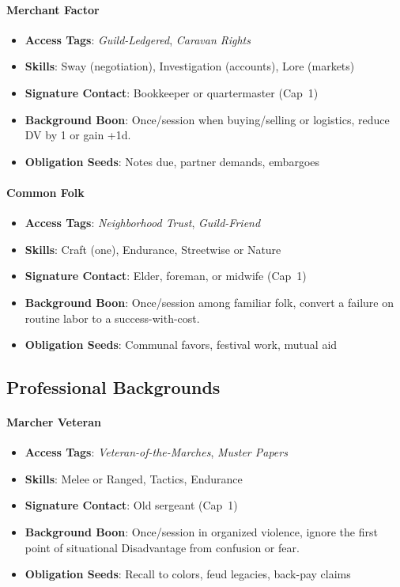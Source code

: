 \begin{multicols}{2}
\paragraph{Merchant Factor}
\begin{itemize}
\item \textbf{Access Tags}: \textit{Guild-Ledgered}, \textit{Caravan Rights}
\item \textbf{Skills}: Sway (negotiation), Investigation (accounts), Lore (markets)
\item \textbf{Signature Contact}: Bookkeeper or quartermaster (Cap~1)
\item \textbf{Background Boon}: Once/session when buying/selling or logistics, reduce DV by 1 or gain +1d.
\item \textbf{Obligation Seeds}: Notes due, partner demands, embargoes
\end{itemize}

\paragraph{Common Folk}
\begin{itemize}
\item \textbf{Access Tags}: \textit{Neighborhood Trust}, \textit{Guild-Friend}
\item \textbf{Skills}: Craft (one), Endurance, Streetwise or Nature
\item \textbf{Signature Contact}: Elder, foreman, or midwife (Cap~1)
\item \textbf{Background Boon}: Once/session among familiar folk, convert a failure on routine labor to a success-with-cost.
\item \textbf{Obligation Seeds}: Communal favors, festival work, mutual aid
\end{itemize}

\subsection*{Professional Backgrounds}

\paragraph{Marcher Veteran}
\begin{itemize}
\item \textbf{Access Tags}: \textit{Veteran-of-the-Marches}, \textit{Muster Papers}
\item \textbf{Skills}: Melee or Ranged, Tactics, Endurance
\item \textbf{Signature Contact}: Old sergeant (Cap~1)
\item \textbf{Background Boon}: Once/session in organized violence, ignore the first point of situational Disadvantage from confusion or fear.
\item \textbf{Obligation Seeds}: Recall to colors, feud legacies, back-pay claims
\end{itemize}


\end{multicols}
